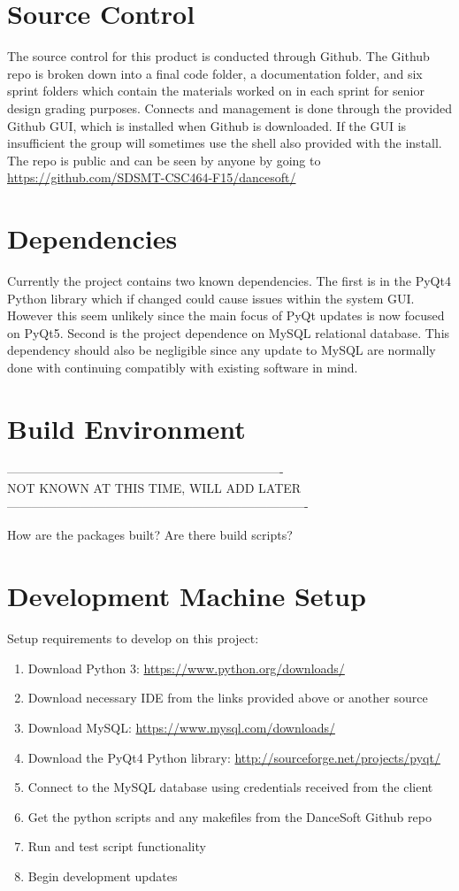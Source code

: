 \section{Source  Control}
The source control for this product is conducted through Github. The Github repo is broken down into a final code folder, a documentation folder, and six sprint folders which contain the materials worked on in each sprint for senior design grading purposes. Connects and management is done through the provided Github GUI, which is installed when Github is downloaded. If the GUI is insufficient the group will sometimes use the shell also provided with the install. The repo is public and can be seen by anyone by going to \url{https://github.com/SDSMT-CSC464-F15/dancesoft/}


\section{Dependencies}
Currently the project contains two known dependencies. The first is in the PyQt4 Python library which if changed could cause issues within the system GUI. However this seem unlikely since the main focus of PyQt updates is now focused on PyQt5. Second is the project dependence on MySQL relational database. This dependency should also be negligible since any update to MySQL are normally done with continuing compatibly with existing software in mind.

\section{Build  Environment}
-------------------------------------------------------------------\\
NOT KNOWN AT THIS TIME, WILL ADD LATER\\
-------------------------------------------------------------------------

How are the packages built?  Are there build scripts? 

\section{Development Machine Setup}
Setup requirements to develop on this project:

\begin{enumerate}
\item Download Python 3: \url{https://www.python.org/downloads/}
\item Download necessary IDE from the links provided above or another source
\item Download MySQL: \url{https://www.mysql.com/downloads/}
\item Download the PyQt4 Python library: \url{http://sourceforge.net/projects/pyqt/}
\item Connect to the MySQL database using credentials received from the client 
\item Get the python scripts and any makefiles from the DanceSoft Github repo
\item Run and test script functionality
\item Begin development updates  
\end{enumerate} 

